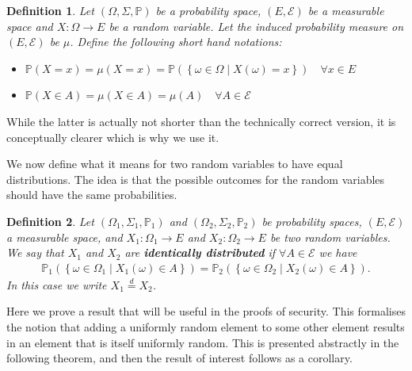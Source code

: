 \documentclass{article}
\newcommand{\eqd}[0]{\stackrel{d}{=}}
\newcommand{\set}[2]{\left\{ #1 \middle| #2 \right\}}
\newtheorem{definition}{Definition}
\theoremstyle{remark}
\renewcommand{\P}{\mathbb{P}}
\begin{document}
\begin{definition}
	Let $(\Omega, \Sigma, \P)$ be a probability space, $(E, \mathcal{E})$ be a
	measurable space and $X: \Omega \to E$ be a random variable. Let the
	induced probability measure on $(E, \mathcal{E})$ be $\mu$. Define the
	following short hand notations:
	\begin{itemize}
		\item $\P(X = x) = \mu(X = x) = \P(\set{\omega \in
			\Omega}{X(\omega) = x}) \quad \forall x \in E$
		\item $\P(X \in A) = \mu(X \in A) = \mu(A) \quad \forall A \in
			\mathcal{E}$
	\end{itemize}
\end{definition}

While the latter is actually not shorter than the technically correct version,
it is conceptually clearer which is why we use it.

We now define what it means for two random variables to have equal
distributions. The idea is that the possible outcomes for the random variables
should have the same probabilities.

\begin{definition}
	Let $(\Omega_1, \Sigma_1, \P_1)$ and $(\Omega_2, \Sigma_2, \P_2)$ be
	probability spaces, $(E, \mathcal{E})$ a measurable space, and $X_1:
	\Omega_1 \to E$ and $X_2: \Omega_2 \to E$ be two random variables. We say
	that $X_1$ and $X_2$ are \textbf{identically distributed} if $\forall A \in
	\mathcal{E}$ we have
	\begin{align*}
		\P_1\left(\set{\omega \in \Omega_1}{X_1(\omega) \in A}\right) =
		\P_2\left(\set{\omega \in \Omega_2}{X_2(\omega) \in A}\right).
	\end{align*}
	In this case we write $X_1 \eqd X_2$.
\end{definition}

Here we prove a result that will be useful in the proofs of security. This
formalises the notion that adding a uniformly random element to some other
element results in an element that is itself uniformly random. This is
presented abstractly in the following theorem, and then the result of interest
follows as a corollary.
\end{document}
